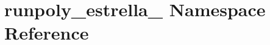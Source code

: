 \hypertarget{namespacerunpoly__estrella__12}{\section{runpoly\-\_\-estrella\-\_ Namespace Reference}
\label{namespacerunpoly__estrella__12}
}
